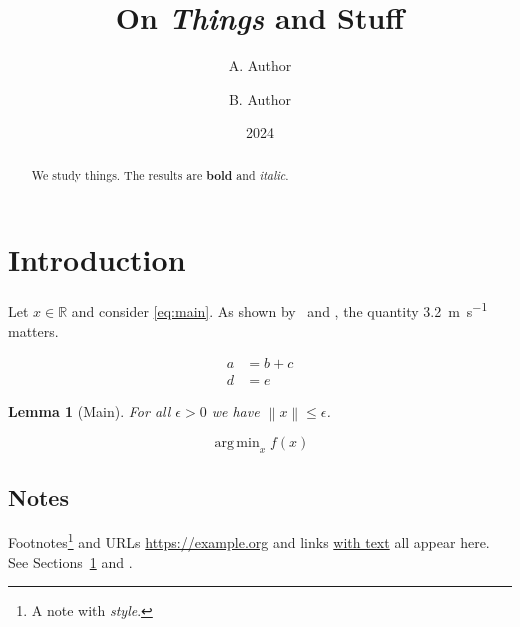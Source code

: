 \documentclass[11pt]{article}
\title{On \emph{Things} and Stuff}
\author{A. Author \and B. Author}
\date{2024}
\newcommand{\R}{\mathbb{R}}
\newcommand{\norm}[1]{\left\lVert #1 \right\rVert}
\DeclareMathOperator*{\argmin}{arg\,min}
\newtheorem{lemma}{Lemma}
\begin{document}
\maketitle

\begin{abstract}
We study things. The results are \textbf{bold} and \textit{italic}.
\end{abstract}

\section{Introduction}\label{sec:intro}
Let $x \in \R$ and consider \cref{eq:main}. As shown by~\textcite{knuth} and
\parencite[p.~3]{lamport}, the quantity \SI{3.2}{\metre\per\second} matters.

\begin{align}
  a &= b + c \label{eq:main} \\
  d &= e \tag{$*$}
\end{align}

\begin{lemma}[Main]
For all $\epsilon > 0$ we have $\norm{x} \leq \epsilon$.
\end{lemma}

\begin{equation*}
  \argmin_{x} f(x)
\end{equation*}


\subsection*{Notes}
Footnotes\footnote{A note with \emph{style}.} and URLs \url{https://example.org}
and links \href{https://example.org}{with text} all appear here. See
Sections~\ref{sec:intro} and .

\printbibliography
\end{document}

